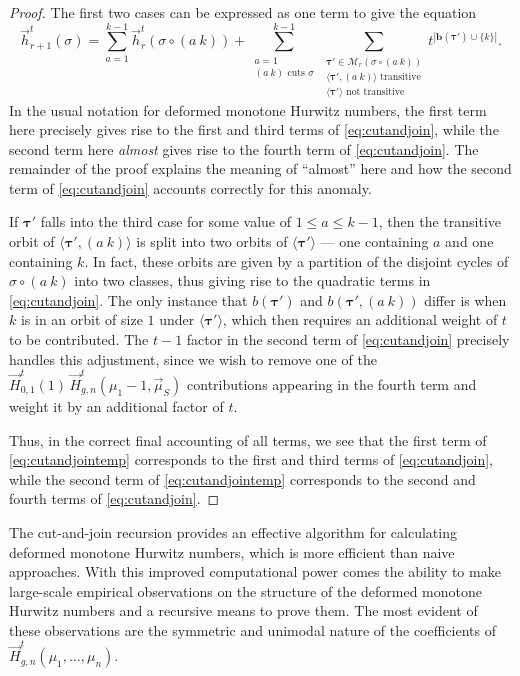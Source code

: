 \documentclass[a4paper]{article}
\theoremstyle{plain}
\numberwithin{theorem}{section}
\theoremstyle{definition}
\theoremstyle{remark}
\renewcommand{\leq}{\leqslant}
\newcommand{\hn}[2]{\vec{h}^{t}_{#1}(#2)}
\newcommand{\HN}[3]{\vec{H}^t_{#1,#2}(#3)}
\begin{document}
\begin{proof}
The first two cases can be expressed as one term to give the equation
\begin{equation} \label{eq:cutandjointemp}
\hn{r+1}{\sigma} = \sum_{a=1}^{k-1} \hn{r}{\sigma \circ (a~k)} + 
 \sum_{\substack{a=1\\ (a~k) \text{ cuts } \sigma}}^{k-1}\sum_{\substack{\bm{\tau}' \in \mathcal{M}_r(\sigma \circ (a~ k)) \\ \langle\bm{\tau}',(a~k)\rangle \text{ transitive}\\\langle\bm{\tau}'\rangle \text{ not transitive} }} t^{|\bm{b}(\bm{\tau}')\cup\{k\}|}.
\end{equation}
In the usual notation for deformed monotone Hurwitz numbers, the first term here precisely gives rise to the first and third terms of \cref{eq:cutandjoin}, while the second term here {\em almost} gives rise to the fourth term of \cref{eq:cutandjoin}. The remainder of the proof explains the meaning of ``almost'' here and how the second term of \cref{eq:cutandjoin} accounts correctly for this anomaly.


If $\bm{\tau}'$ falls into the third case for some value of $1 \leq a \leq k-1$, then the transitive orbit of $\langle \bm{\tau}', (a~k) \rangle$ is split into two orbits of $\langle \bm{\tau}' \rangle$ --- one containing $a$ and one containing $k$. In fact, these orbits are given by a partition of the disjoint cycles of $\sigma \circ (a~k)$ into two classes, thus giving rise to the quadratic terms in \cref{eq:cutandjoin}. The only instance that $b(\bm{\tau}')$ and $b(\bm{\tau}', (a~k))$ differ is when $k$ is in an orbit of size $1$ under $\langle \bm{\tau}' \rangle$, which then requires an additional weight of $t$ to be contributed. The $t-1$ factor in the second term of \cref{eq:cutandjoin} precisely handles this adjustment, since we wish to remove one of the $\HN{0}{1}{1} \, \HN{g}{n}{\mu_1 -1, \vec{\mu}_S}$ contributions appearing in the fourth term and weight it by an additional factor of $t$.


Thus, in the correct final accounting of all terms, we see that the first term of \cref{eq:cutandjointemp} corresponds to the first and third terms of \cref{eq:cutandjoin}, while the second term of \cref{eq:cutandjointemp} corresponds to the second and fourth terms of \cref{eq:cutandjoin}.
\end{proof}


The cut-and-join recursion provides an effective algorithm for calculating deformed monotone Hurwitz numbers, which is more efficient than naive approaches. With this improved computational power comes the ability to make large-scale empirical observations on the structure of the deformed monotone Hurwitz numbers and a recursive means to prove them. The most evident of these observations are the symmetric and unimodal nature of the coefficients of $\HN{g}{n}{\mu_1, \ldots, \mu_n}$.
\end{document}
